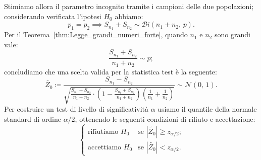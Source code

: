 \begin{defn}[Proporzione]
            Stimiamo allora il parametro incognito tramite i campioni delle due popolazioni; considerando 
            verificata l'ipotesi $H_0$ abbiamo: \[
                p_1 = p_2 \implies S_{n_1} + S_{n_2} \sim \mathcal{B}i(n_1+n_2,\, p)
            .\] Per il Teorema~\ref{thm:Legge_grandi_numeri_forte}, quando $n_1$ e $n_2$ sono grandi vale: \[
                \frac{S_{n_1} + S_{n_2}}{n_1 + n_2} \sim p
            ;\] concludiamo che una scelta valida per la statistica test è la seguente: \[
                \tilde{Z_0} \coloneqq \frac{S_{n_1} - S_{n_2}}{\sqrt{\frac{S_{n_1}+S_{n_2}}{n_1+n_2}\cdot
                \left(1- \frac{S_{n_1}+S_{n_2}}{n_1+n_2}\right)\left(\frac{1}{n_1}+\frac{1}{n_2}\right)}}
                \sim \mathcal{N}(0,\,1)
            .\] Per costruire un test di livello di significatività $\alpha$ usiamo il quantile della normale 
            standard di ordine $\alpha/2$, ottenendo le seguenti condizioni di rifiuto e accettazione: \[
                \begin{cases}
                    \text{rifiutiamo } H_0 & 
                    \text{se $|\tilde{Z_0}| \geq z_{\alpha /2}$;} \\
                    \text{accettiamo } H_0 & 
                    \text{se $|\tilde{Z_0}| < z_{\alpha /2}$.}
                \end{cases}
            \] 
        \end{defn}
